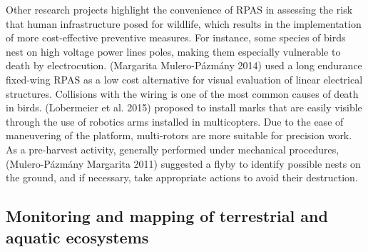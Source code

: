 \documentclass[]{interact}
\theoremstyle{plain}%
\theoremstyle{definition}
\theoremstyle{remark}
\begin{document}
Other research projects highlight the convenience of RPAS in assessing
the risk that human infrastructure posed for wildlife, which results in
the implementation of more cost-effective preventive measures. For
instance, some species of birds nest on high voltage power lines poles,
making them especially vulnerable to death by electrocution. (Margarita
Mulero-Pázmány 2014) used a long endurance fixed-wing RPAS as a low cost
alternative for visual evaluation of linear electrical structures.
Collisions with the wiring is one of the most common causes of death in
birds. (Lobermeier et al. 2015) proposed to install marks that are
easily visible through the use of robotics arms installed in
multicopters. Due to the ease of maneuvering of the platform,
multi-rotors are more suitable for precision work. As a pre-harvest
activity, generally performed under mechanical procedures,
(Mulero-Pázmány Margarita 2011) suggested a flyby to identify possible
nests on the ground, and if necessary, take appropriate actions to avoid
their destruction.

\subsection{Monitoring and mapping of terrestrial and aquatic
ecosystems}\label{monitoring-and-mapping-of-terrestrial-and-aquatic-ecosystems}
\end{document}

